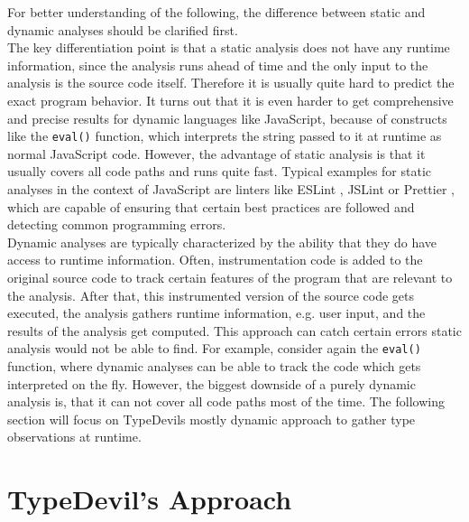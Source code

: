 \documentclass[runningheads,a4paper]{llncs}
\begin{document}
For better understanding of the following, the difference between static and dynamic analyses should be clarified first.\\
The key differentiation point is that a static analysis does not have any runtime information, since the analysis runs ahead of time and the only input to the analysis is the source code itself.
Therefore it is usually quite hard to predict the exact program behavior.
It turns out that it is even harder to get comprehensive and precise results for dynamic languages like JavaScript, because of constructs like the \lstinline[columns=fixed]{eval()} function, which interprets the string passed to it at runtime as normal JavaScript code. 
However, the advantage of static analysis is that it usually covers all code paths and runs quite fast.
Typical examples for static analyses in the context of JavaScript are linters like ESLint \cite{ESLint}, JSLint \cite{JSLint} or Prettier \cite{Prettier}, which are capable of ensuring that certain best practices are followed and detecting common programming errors. \\
Dynamic analyses are typically characterized by the ability that they do have access to runtime information.
Often, instrumentation code is added to the original source code to track certain features of the program that are relevant to the analysis.
After that, this instrumented version of the source code gets executed, the analysis gathers runtime information, e.g. user input, and the results of the analysis get computed.
This approach can catch certain errors static analysis would not be able to find.
For example, consider again the \lstinline[columns=fixed]{eval()} function, where dynamic analyses can be able to track the code which gets interpreted on the fly.
However, the biggest downside of a purely dynamic analysis is, that it can not cover all code paths most of the time.
The following section will focus on TypeDevils mostly dynamic approach to gather type observations at runtime.

\section{TypeDevil's Approach}
\end{document}

